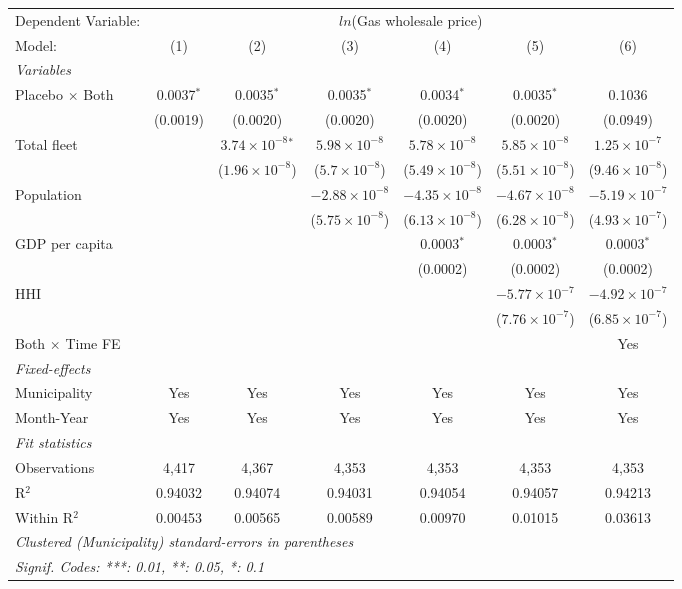 \documentclass[
]{article}
\begin{document}
\begin{tabular}{lcccccc}
\tabularnewline\midrule\midrule
Dependent Variable:&\multicolumn{6}{c}{$ln$(Gas wholesale price)}\\
Model:&(1) & (2) & (3) & (4) & (5) & (6)\\
\midrule \emph{Variables}&   &   &   &   &   &  \\
Placebo $\times $ Both & 0.0037$^{*}$ & 0.0035$^{*}$ & 0.0035$^{*}$ & 0.0034$^{*}$ & 0.0035$^{*}$ & 0.1036\\
  &(0.0019) & (0.0020) & (0.0020) & (0.0020) & (0.0020) & (0.0949)\\
Total fleet &    & $3.74\times 10^{-8}$$^{*}$ & $5.98\times 10^{-8}$ & $5.78\times 10^{-8}$ & $5.85\times 10^{-8}$ & $1.25\times 10^{-7}$\\
  &   & ($1.96\times 10^{-8}$) & ($5.7\times 10^{-8}$) & ($5.49\times 10^{-8}$) & ($5.51\times 10^{-8}$) & ($9.46\times 10^{-8}$)\\
Population &    &    & $-2.88\times 10^{-8}$ & $-4.35\times 10^{-8}$ & $-4.67\times 10^{-8}$ & $-5.19\times 10^{-7}$\\
  &   &    & ($5.75\times 10^{-8}$) & ($6.13\times 10^{-8}$) & ($6.28\times 10^{-8}$) & ($4.93\times 10^{-7}$)\\
GDP per capita &    &    &    & 0.0003$^{*}$ & 0.0003$^{*}$ & 0.0003$^{*}$\\
  &   &    &    & (0.0002) & (0.0002) & (0.0002)\\
HHI &    &    &    &    & $-5.77\times 10^{-7}$ & $-4.92\times 10^{-7}$\\
  &   &    &    &    & ($7.76\times 10^{-7}$) & ($6.85\times 10^{-7}$)\\
Both $\times$ Time FE &  &  &  &  &  & Yes\\
\midrule \emph{Fixed-effects}&   &   &   &   &   &  \\
Municipality & Yes & Yes & Yes & Yes & Yes & Yes\\
Month-Year & Yes & Yes & Yes & Yes & Yes & Yes\\
\midrule \emph{Fit statistics}&  & & & & & \\
Observations & 4,417&4,367&4,353&4,353&4,353&4,353\\
R$^2$ & 0.94032&0.94074&0.94031&0.94054&0.94057&0.94213\\
Within R$^2$ & 0.00453&0.00565&0.00589&0.00970&0.01015&0.03613\\
\midrule\midrule\multicolumn{7}{l}{\emph{Clustered (Municipality) standard-errors in parentheses}}\\
\multicolumn{7}{l}{\emph{Signif. Codes: ***: 0.01, **: 0.05, *: 0.1}}\\
\end{tabular}
\end{document}
